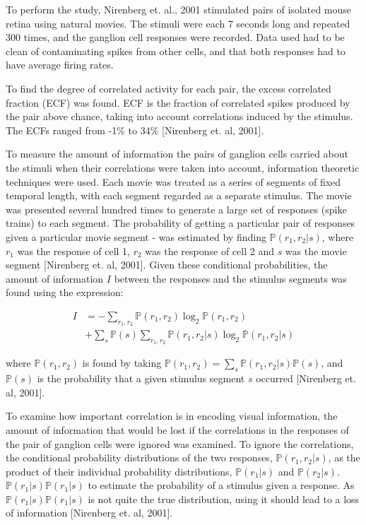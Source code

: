 \documentclass[twoside]{article}
\begin{document}
\begin{multicols}{2}
To perform the study, Nirenberg et. al., 2001 stimulated pairs of isolated mouse retina using natural movies. The stimuli were each 7 seconds long and repeated 300 times, and the ganglion cell responses were recorded. Data used had to be clean of contaminating spikes from other cells, and that both responses had to have average firing rates. 

To find the degree of correlated activity for each pair, the excess correlated fraction (ECF) was found. ECF is the fraction of correlated spikes produced by the pair above chance, taking into account correlations induced by the stimulus. The ECFs ranged from -1\% to 34\% [Nirenberg et. al, 2001]. 

To measure the amount of information the pairs of ganglion cells carried about the stimuli when their correlations were taken into account, information theoretic techniques were used. Each movie was treated as a series of segments of fixed temporal length, with each segment regarded as a separate stimulus. The movie was presented several hundred times to generate a large set of responses (spike trains) to each segment. The probability of getting a particular pair of responses given a particular movie segment - was estimated by finding $\mathbb{P}(r_1,r_2|s)$, where $r_1$ was the response of cell 1, $r_2$ was the response of cell 2 and $s$ was the movie segment [Nirenberg et. al, 2001]. Given these conditional probabilities, the amount of information $I$ between the responses and the stimulus segments was found using the expression:


\begin{align}\label{eq:info-theory}
	I 
		&= -\sum_{r_1,r_2}\mathbb{P}(r_1,r_2)\log_2\mathbb{P}(r_1,r_2) \\
  		&+ \sum_s\mathbb{P}(s) \sum_{r_1,r_2}\mathbb{P}(r_1,r_2|s)\log_2\mathbb{P}(r_1,r_2|s)
\end{align}

where $\mathbb{P}(r_1,r_2)$ is found by taking $\mathbb{P}(r_1,r_2) = \sum_s \mathbb{P}(r_1,r_2|s)\mathbb{P}(s)$, and $\mathbb{P}(s)$ is the probability that a given stimulus segment $s$ occurred [Nirenberg et. al, 2001]. 

To examine how important correlation is in encoding visual information, the amount of information that would be lost if the correlations in the responses of the pair of ganglion cells were ignored was examined. To ignore the correlations, the conditional probability distributions of the two responses, $\mathbb{P}(r_1,r_2|s)$, as the product of their individual probability distributions, $\mathbb{P}(r_1|s)$ and $\mathbb{P}(r_2|s)$. $\mathbb{P}(r_1|s)\mathbb{P}(r_1|s)$ to estimate the probability of a stimulus given a response. As $\mathbb{P}(r_1|s)\mathbb{P}(r_1|s)$ is not quite the true distribution, using it should lead to a loss of information [Nirenberg et. al, 2001]. 


\end{multicols}
\end{document}
